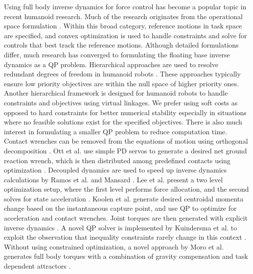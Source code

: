 \documentclass{ws-ijhr}
\begin{document}
Using full body inverse dynamics for force control has become a popular topic
in recent humanoid research. Much of the research originates from the 
operational space formulation \cite{khatib_op_space_ctrl}. 
Within this broad category, reference motions in task space are specified, 
and convex optimization is used to handle constraints and solve for controls
that best track the reference motions. 
Although detailed formulations differ, much research has converged to 
formulating the floating base inverse dynamics as a QP problem. 
Hierarchical approaches are used to resolve redundant degrees of freedom in 
humanoid robots \cite{eth_id,Hutter01052014,alex_hir,saab_fast_hir_qp,deLasa_hir,wensing_hir}. 
These approaches typically ensure low priority objectives are within the null
space of higher priority ones. 
Another hierarchical framework \cite{sentis_com_virtual_linkage,sentis_wbc} 
is designed for humanoid robots to handle constraints and objectives using 
virtual linkages. 
We prefer using soft costs as opposed to hard constraints for better numerical 
stability especially in situations where no feasible solutions exist for the 
specified objectives.
There is also much interest in formulating a smaller QP problem to reduce 
computation time. Contact wrenches can be removed from the
equations of motion using orthogonal decomposition \cite{usc_id1}.
Ott et al. use simple PD servos to generate a desired net ground reaction 
wrench, which is then distributed among predefined contacts using 
optimization \cite{ott_force_alloc}.
Decoupled dynamics are used to speed up inverse dynamics calculations by 
Ramos et al. and Mansard \cite{ramos_dyn_walking,mansard_decoupled}.
Lee et al. present a two level optimization setup, 
where the first level performs force allocation, and the second solves for 
state acceleration \cite{lee_separate_grf}.
Koolen et al. generate desired centroidal momenta change based on the 
instantaneous capture point, and use QP to optimize for acceleration and 
contact wrenches. Joint torques are then generated with explicit inverse 
dynamics \cite{ihmc_vrc}. 
A novel QP solver is implemented by Kuindersma et al. to exploit
the observation that inequality constraints rarely change in this 
context \cite{scott_qp}.
Without using constrained optimization, a novel approach by 
Moro et al. generates full body torques with a combination 
of gravity compensation and task dependent attractors \cite{moro_attractor}.
\end{document}
